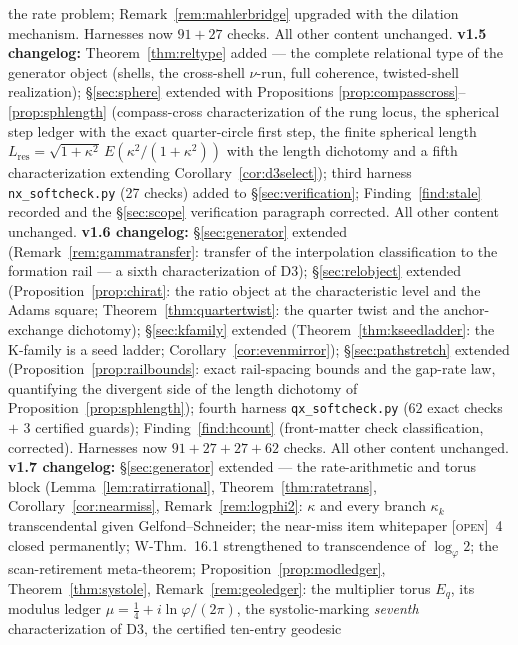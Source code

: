 \documentclass[11pt]{article}
\newcommand{\tagO}{\textcolor{cO}{\textsc{[open]}}}
\newcommand{\gp}{\varphi}
\theoremstyle{plain}
\theoremstyle{definition}
\theoremstyle{remark}
\begin{document}
the rate problem; Remark~\ref{rem:mahlerbridge} upgraded with the dilation
mechanism. Harnesses now $91+27$ checks. All other content unchanged.
\textbf{v1.5 changelog:} Theorem~\ref{thm:reltype} added --- the complete
relational type of the generator object (shells, the cross-shell $\nu$-run,
full coherence, twisted-shell realization); \S\ref{sec:sphere} extended with
Propositions \ref{prop:compasscross}--\ref{prop:sphlength} (compass-cross
characterization of the rung locus, the spherical step ledger with the exact
quarter-circle first step, the finite spherical length
$L_{\mathrm{res}}=\sqrt{1+\kappa^2}\,E(\kappa^2/(1+\kappa^2))$ with the
length dichotomy and a fifth characterization extending
Corollary~\ref{cor:d3select}); third harness \texttt{nx\_softcheck.py}
(27 checks) added to \S\ref{sec:verification};
Finding~\ref{find:stale} recorded and the \S\ref{sec:scope} verification
paragraph corrected. All other content unchanged.
\textbf{v1.6 changelog:} \S\ref{sec:generator} extended
(Remark~\ref{rem:gammatransfer}: transfer of the interpolation
classification to the formation rail --- a sixth characterization of D3);
\S\ref{sec:relobject} extended (Proposition~\ref{prop:chirat}: the ratio
object at the characteristic level and the Adams square;
Theorem~\ref{thm:quartertwist}: the quarter twist and the anchor-exchange
dichotomy); \S\ref{sec:kfamily} extended
(Theorem~\ref{thm:kseedladder}: the K-family is a seed ladder;
Corollary~\ref{cor:evenmirror}); \S\ref{sec:pathstretch} extended
(Proposition~\ref{prop:railbounds}: exact rail-spacing bounds and the
gap-rate law, quantifying the divergent side of the length dichotomy of
Proposition~\ref{prop:sphlength}); fourth harness
\texttt{qx\_softcheck.py} ($62$ exact checks $+$ $3$ certified guards);
Finding~\ref{find:hcount} (front-matter check classification, corrected).
Harnesses now $91+27+27+62$ checks. All other content unchanged.
\textbf{v1.7 changelog:} \S\ref{sec:generator} extended --- the
rate-arithmetic and torus block (Lemma~\ref{lem:ratirrational},
Theorem~\ref{thm:ratetrans}, Corollary~\ref{cor:nearmiss},
Remark~\ref{rem:logphi2}: $\kappa$ and every branch $\kappa_k$ transcendental
given Gelfond--Schneider; the near-miss item whitepaper \tagO{}~4 closed
permanently; W-Thm.\ 16.1 strengthened to transcendence of $\log_\gp2$; the
scan-retirement meta-theorem; Proposition~\ref{prop:modledger},
Theorem~\ref{thm:systole}, Remark~\ref{rem:geoledger}: the multiplier torus
$E_q$, its modulus ledger $\mu=\tfrac14+i\ln\gp/(2\pi)$, the systolic-marking
\emph{seventh} characterization of D3, the certified ten-entry geodesic
\end{document}
